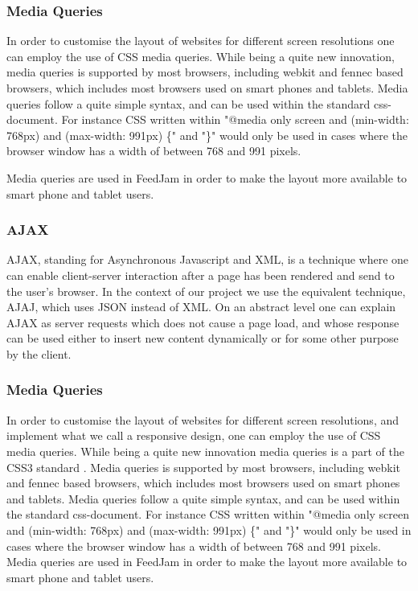 \subsubsection{Media Queries} %
In order to customise the layout of websites for different screen resolutions one can employ the use of CSS media queries. While being a quite new innovation, media queries is supported by most browsers, including webkit and fennec based browsers, which includes most browsers used on smart phones and tablets. Media queries follow a quite simple syntax, and can be used within the standard css-document. For instance CSS written within "@media only screen and (min-width: 768px) and (max-width: 991px) \{" and "\}" would only be used in cases where the browser window has a width of between 768 and 991 pixels. 

Media queries are used in FeedJam in order to make the layout more available to smart phone and tablet users.

\subsubsection{AJAX}%
AJAX, standing for Asynchronous Javascript and XML, is a technique where one can enable client-server interaction after a page has been rendered and send to the user's browser. In the context of our project we use the equivalent technique, AJAJ, which uses JSON instead of XML. On an abstract level one can explain AJAX as server requests which does not cause a page load, and whose response can be used either to insert new content dynamically or for some other purpose by the client.

\subsubsection{Media Queries} %
In order to customise the layout of websites for different screen resolutions, and implement what we call a responsive design, one can employ the use of CSS media queries. While being a quite new innovation media queries is a part of the CSS3 standard \cite{W3C}. Media queries is supported by most browsers, including webkit and fennec based browsers, which includes most browsers used on smart phones and tablets. Media queries follow a quite simple syntax, and can be used within the standard css-document. For instance CSS written within "@media only screen and (min-width: 768px) and (max-width: 991px) \{" and "\}" would only be used in cases where the browser window has a width of between 768 and 991 pixels. Media queries are used in FeedJam in order to make the layout more available to smart phone and tablet users.

